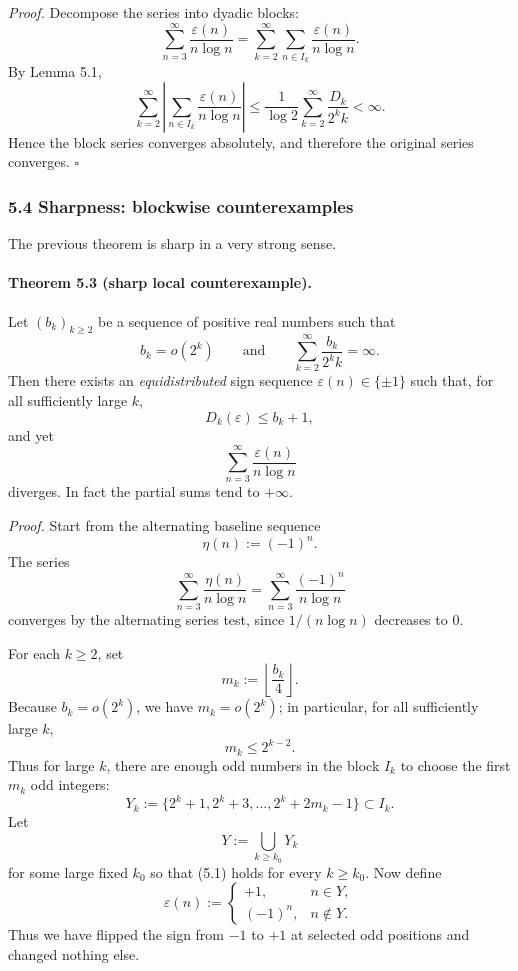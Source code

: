 \emph{Proof.}
Decompose the series into dyadic blocks:
\[
\sum_{n=3}^{\infty}\frac{\varepsilon(n)}{n\log n}
= \sum_{k=2}^{\infty}\sum_{n\in I_k}\frac{\varepsilon(n)}{n\log n}.
\]
By Lemma 5.1,
\[
\sum_{k=2}^{\infty}\left|\sum_{n\in I_k}\frac{\varepsilon(n)}{n\log n}\right|
\le \frac{1}{\log 2}\sum_{k=2}^{\infty}\frac{D_k}{2^k k}<\infty.
\]
Hence the block series converges absolutely, and therefore the original series converges.
\hfill$\square$

\subsubsection{5.4 Sharpness: blockwise counterexamples}

The previous theorem is sharp in a very strong sense.

\paragraph{Theorem 5.3 (sharp local counterexample).}
Let \((b_k)_{k\ge 2}\) be a sequence of positive real numbers such that
\[
b_k=o(2^k)
\qquad\text{and}\qquad
\sum_{k=2}^{\infty}\frac{b_k}{2^k k}=\infty.
\]
Then there exists an \emph{equidistributed} sign sequence \(\varepsilon(n)\in\{\pm 1\}\) such that, for all sufficiently large \(k\),
\[
D_k(\varepsilon)\le b_k+1,
\]
and yet
\[
\sum_{n=3}^{\infty}\frac{\varepsilon(n)}{n\log n}
\]
diverges.  In fact the partial sums tend to \(+\infty\).

\emph{Proof.}
Start from the alternating baseline sequence
\[
\eta(n):=(-1)^n.
\]
The series
\[
\sum_{n=3}^{\infty}\frac{\eta(n)}{n\log n}
=\sum_{n=3}^{\infty}\frac{(-1)^n}{n\log n}
\]
converges by the alternating series test, since \(1/(n\log n)\) decreases to \(0\).

For each \(k\ge 2\), set
\[
m_k:=\left\lfloor \frac{b_k}{4}\right\rfloor.
\]
Because \(b_k=o(2^k)\), we have \(m_k=o(2^k)\); in particular, for all sufficiently large \(k\),
\[
m_k\le 2^{k-2}.
\tag{5.1}
\]
Thus for large \(k\), there are enough odd numbers in the block \(I_k\) to choose the first \(m_k\) odd integers:
\[
Y_k:=\{2^k+1,2^k+3,\dots,2^k+2m_k-1\}\subset I_k.
\]
Let
\[
Y:=\bigcup_{k\ge k_0} Y_k
\]
for some large fixed \(k_0\) so that (5.1) holds for every \(k\ge k_0\).  Now define
\[
\varepsilon(n):=
\begin{cases}
+1, & n\in Y,\\
(-1)^n, & n\notin Y.
\end{cases}
\]
Thus we have flipped the sign from \(-1\) to \(+1\) at selected odd positions and changed nothing else.

